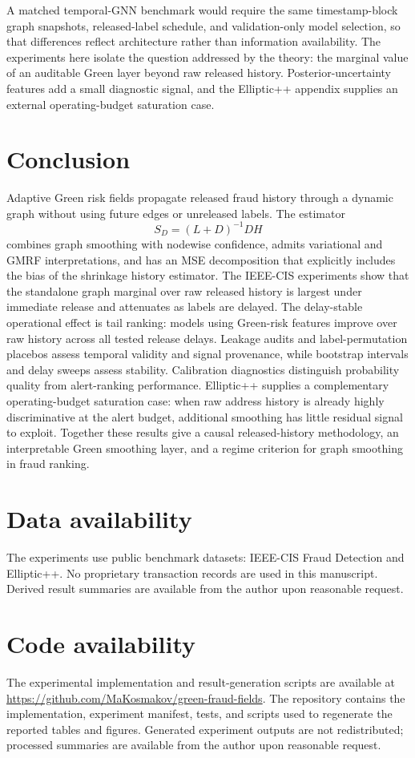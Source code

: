 \documentclass[11pt]{article}
\theoremstyle{definition}
\theoremstyle{remark}
\begin{document}
A matched temporal-GNN benchmark would require the same timestamp-block graph snapshots, released-label schedule, and validation-only model selection, so that differences reflect architecture rather than information availability. The experiments here isolate the question addressed by the theory: the marginal value of an auditable Green layer beyond raw released history. Posterior-uncertainty features add a small diagnostic signal, and the Elliptic++ appendix supplies an external operating-budget saturation case.

\section{Conclusion}

Adaptive Green risk fields propagate released fraud history through a dynamic graph without using future edges or unreleased labels. The estimator
\[
        S_D=(L+D)^{-1}DH
\]
combines graph smoothing with nodewise confidence, admits variational and GMRF interpretations, and has an MSE decomposition that explicitly includes the bias of the shrinkage history estimator. The IEEE-CIS experiments show that the standalone graph marginal over raw released history is largest under immediate release and attenuates as labels are delayed. The delay-stable operational effect is tail ranking: models using Green-risk features improve over raw history across all tested release delays. Leakage audits and label-permutation placebos assess temporal validity and signal provenance, while bootstrap intervals and delay sweeps assess stability. Calibration diagnostics distinguish probability quality from alert-ranking performance. Elliptic++ supplies a complementary operating-budget saturation case: when raw address history is already highly discriminative at the alert budget, additional smoothing has little residual signal to exploit. Together these results give a causal released-history methodology, an interpretable Green smoothing layer, and a regime criterion for graph smoothing in fraud ranking.


\section*{Data availability}
The experiments use public benchmark datasets: IEEE-CIS Fraud Detection and Elliptic++. No proprietary transaction records are used in this manuscript. Derived result summaries are available from the author upon reasonable request.

\section*{Code availability}
The experimental implementation and result-generation scripts are available at \url{https://github.com/MaKosmakov/green-fraud-fields}. The repository contains the implementation, experiment manifest, tests, and scripts used to regenerate the reported tables and figures. Generated experiment outputs are not redistributed; processed summaries are available from the author upon reasonable request.
\end{document}
